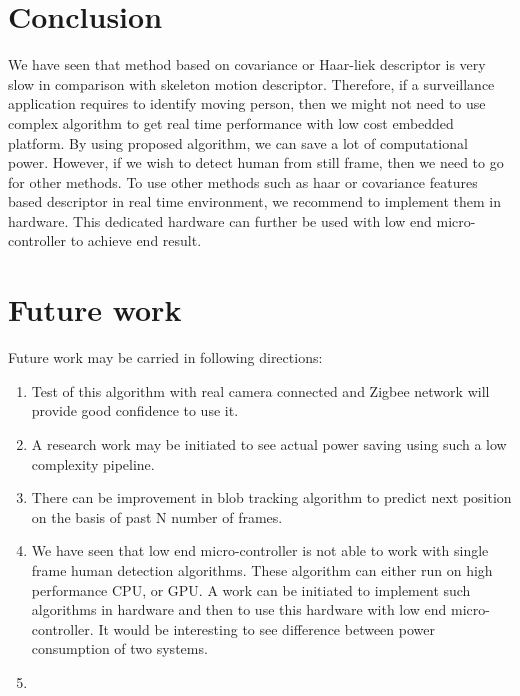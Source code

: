 \section{Conclusion}
\indent We have seen that method based on covariance or Haar-liek
descriptor is very slow in comparison with skeleton motion descriptor.
Therefore, if a surveillance application requires to identify moving
person, then we might not need to use complex algorithm to get real time
performance with low cost embedded platform. By using proposed
algorithm, we can save a lot of computational power. However, if we wish
to detect human from still frame, then we need to go for other methods.
To use other methods such as haar or covariance features based
descriptor in real time environment, we recommend to implement them in
hardware. This dedicated hardware can further be used with low end
micro-controller to achieve end result.
\section{Future work}
Future work may be carried in following directions:
\begin{enumerate}
\item Test of this algorithm with real camera connected and Zigbee
network will provide good confidence to use it.
\item A research work may be initiated to see actual power saving using
such a low complexity pipeline.
\item There can be improvement in blob tracking algorithm to predict
next position on the basis of past N number of frames.
\item We have seen that low end micro-controller is not able to work with
single frame human detection algorithms. These algorithm can either run on
high performance CPU, or GPU. A work can be initiated to implement such
algorithms in hardware and then to use this hardware with low end
micro-controller. It would be interesting to see difference between power
consumption of two systems.
\item 
\end{enumerate}



